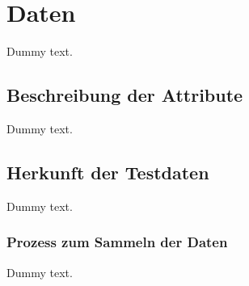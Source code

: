 \chapter{Daten}

Dummy text.

\section{Beschreibung der Attribute}

Dummy text.

\section{Herkunft der Testdaten}

Dummy text.

\subsection{Prozess zum Sammeln der Daten}

Dummy text.